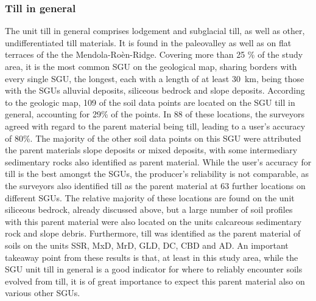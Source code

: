 \documentclass[preprint,12pt,authoryear]{elsarticle}
\begin{document}
\subsubsection{Till in general}
The unit till in general comprises lodgement and subglacial till, as well as other, undifferentiated till materials. It is found in the paleovalley as well as on flat terraces of the the Mendola-Ro\`en-Ridge.   Covering more than 25 \% of the study area, it is the most common SGU on the geological map, sharing borders with every single SGU, the longest, each with a length of at least 30~km, being those with the SGUs alluvial deposits,  siliceous bedrock and slope deposits. According to the geologic map, 109 of the soil data points are located on the SGU till in general, accounting for 29\% of the points. In 88 of these locations, the surveyors agreed with regard to the parent material being till, leading to a user's accuracy of 80\%. The majority of the other soil data points on this SGU were attributed the parent materials slope deposits or  mixed deposits, with some intermediary sedimentary rocks also identified as parent material. While the user's accuracy for till is the best amongst the SGUs, the producer's reliability is not comparable, as the surveyors also identified till as the parent material at 63 further locations on different SGUs. The relative majority of these locations are found on the unit siliceous bedrock, already discussed above, but a large number of soil profiles with this parent material were also located on the units calcareous sedimentary rock and slope debris. Furthermore, till was identified as the parent material of soils on the units SSR, MxD, MrD, GLD, DC, CBD and AD. An important takeaway point from these results is that, at least in this study area, while the SGU unit till in general is a good indicator for where to reliably encounter soils evolved from till, it is of great importance to expect this  parent material also on various other SGUs.
\end{document}
